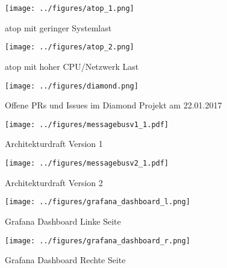 \begin{figure}[tbph]
  \centering
  \texttt{[image: ../figures/atop\_1.png]}
  \caption{atop mit geringer Systemlast}
\label{figure:atop1}
\end{figure}

\begin{figure}[tbp]
  \centering
  \texttt{[image: ../figures/atop\_2.png]}
  \caption{atop mit hoher CPU/Netzwerk Last}
\label{figure:atop2}
\end{figure}

\begin{figure}[tbp]
  \centering
  \texttt{[image: ../figures/diamond.png]}
  \caption{Offene PRs und Issues im Diamond Projekt am 22.01.2017}
\label{figure:diamond}
\end{figure}

\begin{figure}[tbp]
  \centering
  \texttt{[image: ../figures/messagebusv1\_1.pdf]}
  \caption{Architekturdraft Version 1}
\label{figure:draft1}
\end{figure}
\begin{figure}[tbp]
  \centering
  \texttt{[image: ../figures/messagebusv2\_1.pdf]}
  \caption{Architekturdraft Version 2}
\label{figure:draft2}
\end{figure}
\FloatBarrier{}

\begin{figure}[tbp]
  \centering
  \texttt{[image: ../figures/grafana\_dashboard\_l.png]}
  \caption{Grafana Dashboard Linke Seite}
\label{figure:grafana_dashboard_l}
\end{figure}

\begin{figure}[tbp]
  \centering
  \texttt{[image: ../figures/grafana\_dashboard\_r.png]}
  \caption{Grafana Dashboard Rechte Seite}
\label{figure:grafana_dashboard_r}
\end{figure}


